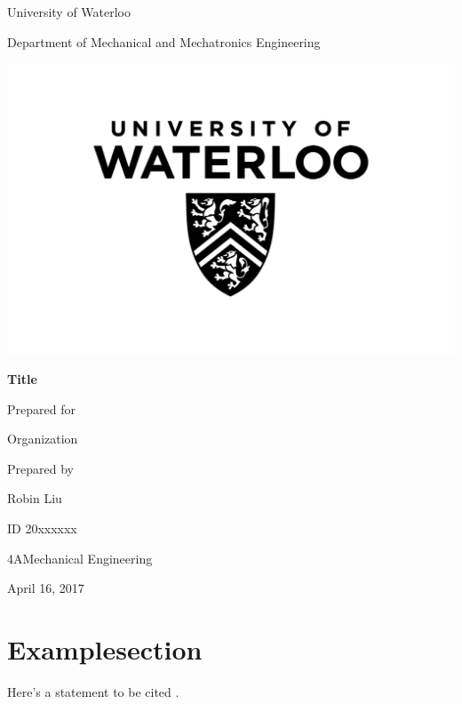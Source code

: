 \documentclass[12pt,letterpaper]{article}
\newcommand{\dateofsubmittal}{April 16, 2017}
\newcommand{\department}{Department of Mechanical and Mechatronics Engineering}
\newcommand{\yourname}{Robin Liu}
\newcommand{\youridnumber}{20xxxxxx}
\newcommand{\academicterm}{4A}
\newcommand{\yourdiscipline}{Mechanical Engineering}
\newcommand{\yourorganization}{Organization} %
\newcommand{\reporttitle}{Title}
\begin{document}
  \begin{titlepage}
    \vspace*{\fill}
    \centering
    {
    {\large{University of Waterloo}

    \large{\department}

    }}
    \bigskip
    \includegraphics[width=0.3\paperwidth]{uwlogo.jpg}

    \bigskip\bigskip\bigskip
      \textbf{\huge{\reporttitle}}

    \bigskip\bigskip\bigskip
    \large{Prepared for}

      \bigskip
      {
      \yourorganization

      }
      \bigskip\bigskip
    \large{Prepared by}

      \bigskip
      {
      \yourname

      ID \youridnumber

      \academicterm\:\yourdiscipline

      }
      \dateofsubmittal{}

    \bigskip\bigskip
    \vspace*{\fill}
  \end{titlepage}
  \clearpage
  \tableofcontents{}\setcounter{page}{1}
  \clearpage
  \listoffigures
  \clearpage
  \listoftables
  \clearpage
  
  \clearpage
  \section{Examplesection} %
    Here's a statement to be cited \cite{example}.
\end{document}
